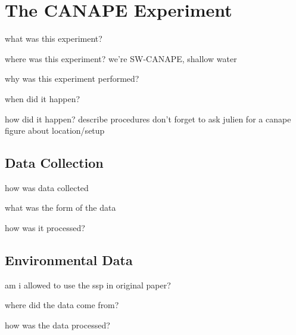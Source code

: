 \section{The CANAPE Experiment}

what was this experiment?

where was this experiment?
we're SW-CANAPE, shallow water

why was this experiment performed?

when did it happen?

how did it happen? describe procedures
don't forget to ask julien for a canape figure about location/setup


\subsection{Data Collection}

how was data collected

what was the form of the data

how was it processed?

\subsection{Environmental Data}
am i allowed to use the ssp in original paper?

where did the data come from?

how was the data processed?

